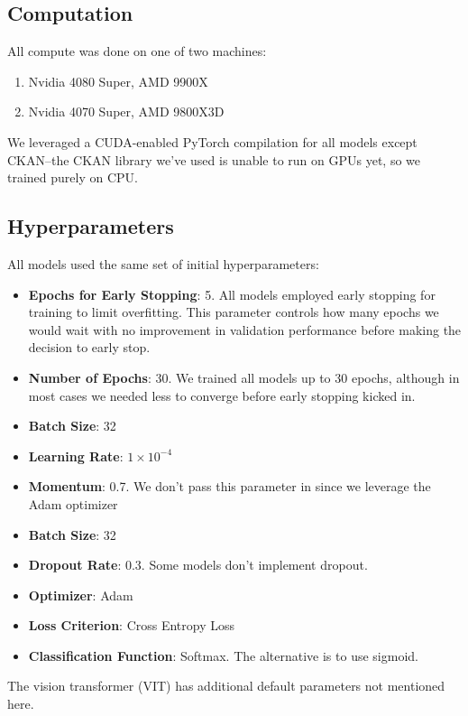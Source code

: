 \documentclass[conference]{IEEEtran}
\begin{document}
\subsection{Computation}
All compute was done on one of two machines:
\begin{enumerate}
    \item Nvidia 4080 Super, AMD 9900X
    \item Nvidia 4070 Super, AMD 9800X3D
\end{enumerate}

We leveraged a CUDA-enabled PyTorch compilation for all models except CKAN--the CKAN library we've used is unable to run on GPUs yet, so we trained purely on CPU.

\subsection{Hyperparameters}
All models used the same set of initial hyperparameters:
\begin{itemize}
    \item \textbf{Epochs for Early Stopping}: 5. All models employed early stopping for training to limit overfitting. This parameter controls how many epochs we would wait with no improvement in validation performance before making the decision to early stop.
    
    \item \textbf{Number of Epochs}: 30. We trained all models up to 30 epochs, although in most cases we needed less to converge before early stopping kicked in.

    \item \textbf{Batch Size}: 32
    
    \item \textbf{Learning Rate}: $1 \times 10^{-4}$
    
    \item \textbf{Momentum}: 0.7. We don't pass this parameter in since we leverage the Adam optimizer
    
    \item \textbf{Batch Size}: 32

    \item \textbf{Dropout Rate}: 0.3. Some models don't implement dropout.

    \item \textbf{Optimizer}: Adam

    \item \textbf{Loss Criterion}: Cross Entropy Loss

    \item \textbf{Classification Function}: Softmax. The alternative is to use sigmoid.
\end{itemize}

The vision transformer (VIT) has additional default parameters not mentioned here.



\end{document}
